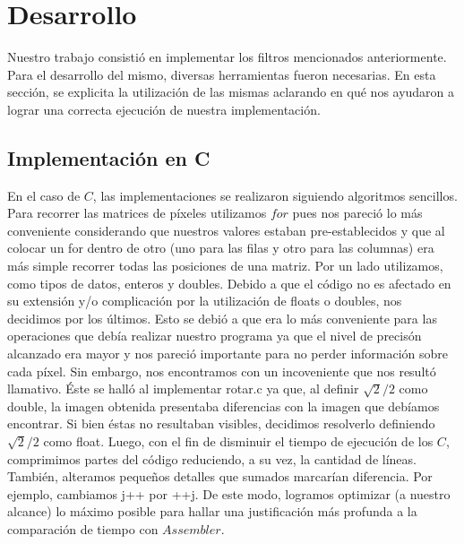 \documentclass[10pt, a4paper]{article}
\begin{document}
\section{Desarrollo}
Nuestro trabajo consistió en implementar los filtros mencionados anteriormente. Para el desarrollo del mismo, diversas herramientas fueron necesarias. En esta sección, se explicita la utilización de las mismas aclarando en qué nos ayudaron a lograr una correcta ejecución de nuestra implementación.  
\subsection{Implementación en C}
En el caso de $C$, las implementaciones se realizaron siguiendo algoritmos sencillos. Para recorrer las matrices de píxeles utilizamos $for$ pues nos pareció lo más conveniente considerando que nuestros valores estaban pre-establecidos y que al colocar un for dentro de otro (uno para las filas y otro para las columnas) era más simple recorrer todas las posiciones de una matriz.
\newline
Por un lado utilizamos, como tipos de datos, enteros y doubles. Debido a que el código no es afectado en su extensión y/o complicación por la utilización de floats o doubles, nos decidimos por los últimos. Esto se debió a que era lo más conveniente para las operaciones que debía realizar nuestro programa ya que el nivel de precisón alcanzado era mayor y nos pareció importante para no perder información sobre cada píxel. Sin embargo, nos encontramos con un incoveniente que nos resultó llamativo. Éste se halló al implementar rotar.c ya que, al definir $\sqrt{2}/2$ como double, la imagen obtenida presentaba diferencias con la imagen que debíamos encontrar. Si bien éstas no resultaban visibles, decidimos resolverlo definiendo $\sqrt{2}/2$ como float.\newline
\newline
Luego, con el fin de disminuir el tiempo de ejecución de los $C$, comprimimos partes del código reduciendo, a su vez, la cantidad de líneas. También, alteramos pequeños detalles que sumados marcarían diferencia. Por ejemplo, cambiamos j++ por ++j. De este modo, logramos optimizar (a nuestro alcance) lo máximo posible para hallar una justificación más profunda a la comparación de tiempo con $Assembler$. 
\end{document}
